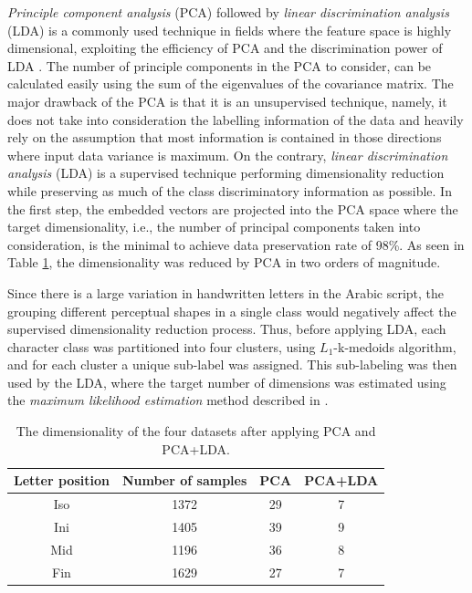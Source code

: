 \documentclass[10pt, conference, compsocconf]{IEEEtran}
\begin{document}
\emph{Principle component analysis} (PCA) followed by \emph{linear discrimination analysis} (LDA) is a commonly used technique in fields where the feature space is highly dimensional, exploiting the efficiency of PCA and the discrimination power of LDA \cite{yu2001direct,yang2003can}.
The number of principle components in the PCA to consider, can be calculated easily using the sum of the eigenvalues of the covariance matrix.
The major drawback of the PCA is that it is an unsupervised technique, namely, it does not take into consideration the labelling information of the data and heavily rely on the assumption that most information is contained in those directions where input data variance is maximum.
On the contrary, \emph{linear discrimination analysis} (LDA) \cite{fisher1936use} is a supervised technique performing dimensionality reduction while preserving as much of the class discriminatory information as possible. 
In the first step, the embedded vectors are projected into the PCA space where the target dimensionality, i.e., the number of principal components taken into consideration, is the minimal to achieve data preservation rate of 98\%.
As seen in Table \ref{table:dr_dimensions_results}, the dimensionality was reduced by PCA in two orders of magnitude.

Since there is a large variation in handwritten letters in the Arabic script, the grouping different perceptual shapes in a single class would negatively affect the supervised dimensionality reduction process.
Thus, before applying LDA, each character class was partitioned into four clusters, using $L_1$-k-medoids algorithm, and for each cluster a unique sub-label was assigned. 
This sub-labeling was then used by the LDA, where the target number of dimensions was estimated using the \emph{maximum likelihood estimation} method described in \cite{levina2004maximum}.

\begin{table}
\centering
\begin{tabular}{ | c | c | c | c |}
\hline
Letter position & Number of samples & PCA & PCA+LDA\\
\hline                 
  Iso & 1372 & 29 & 7 \\ 
  \hline
  Ini & 1405 & 39 & 9 \\ 
  \hline
  Mid & 1196 & 36 & 8 \\ 
  \hline
  Fin & 1629 & 27 & 7 \\ 
  \hline
\end{tabular}
\caption{The dimensionality of the four datasets after applying PCA and PCA+LDA.}
\label{table:dr_dimensions_results} 
\end{table}
\end{document}

